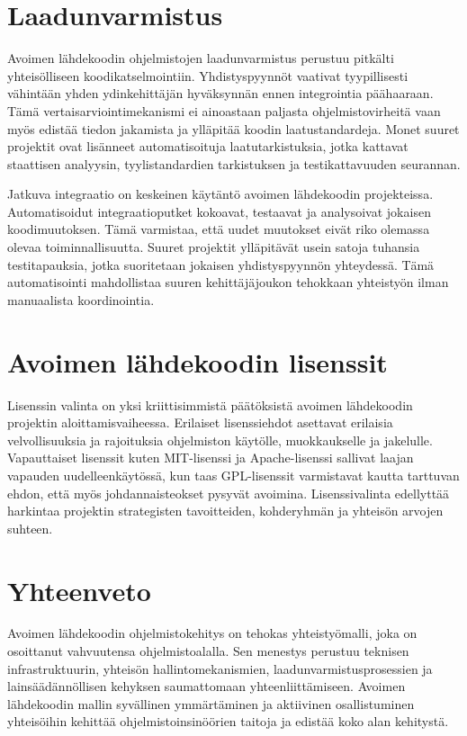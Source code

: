 \documentclass[
    language=finnish,
    doctype=article,
]{../../omnilatex}
\begin{document}
\section{Laadunvarmistus}
Avoimen lähdekoodin ohjelmistojen laadunvarmistus perustuu pitkälti yhteisölliseen koodikatselmointiin. Yhdistyspyynnöt vaativat tyypillisesti vähintään yhden ydinkehittäjän hyväksynnän ennen integrointia päähaaraan. Tämä vertaisarviointimekanismi ei ainoastaan paljasta ohjelmistovirheitä vaan myös edistää tiedon jakamista ja ylläpitää koodin laatustandardeja. Monet suuret projektit ovat lisänneet automatisoituja laatutarkistuksia, jotka kattavat staattisen analyysin, tyylistandardien tarkistuksen ja testikattavuuden seurannan.

Jatkuva integraatio on keskeinen käytäntö avoimen lähdekoodin projekteissa. Automatisoidut integraatioputket kokoavat, testaavat ja analysoivat jokaisen koodimuutoksen. Tämä varmistaa, että uudet muutokset eivät riko olemassa olevaa toiminnallisuutta. Suuret projektit ylläpitävät usein satoja tuhansia testitapauksia, jotka suoritetaan jokaisen yhdistyspyynnön yhteydessä. Tämä automatisointi mahdollistaa suuren kehittäjäjoukon tehokkaan yhteistyön ilman manuaalista koordinointia.

\section{Avoimen lähdekoodin lisenssit}
Lisenssin valinta on yksi kriittisimmistä päätöksistä avoimen lähdekoodin projektin aloittamisvaiheessa. Erilaiset lisenssiehdot asettavat erilaisia velvollisuuksia ja rajoituksia ohjelmiston käytölle, muokkaukselle ja jakelulle. Vapauttaiset lisenssit kuten MIT-lisenssi ja Apache-lisenssi sallivat laajan vapauden uudelleenkäytössä, kun taas GPL-lisenssit varmistavat kautta tarttuvan ehdon, että myös johdannaisteokset pysyvät avoimina. Lisenssivalinta edellyttää harkintaa projektin strategisten tavoitteiden, kohderyhmän ja yhteisön arvojen suhteen.

\section{Yhteenveto}
Avoimen lähdekoodin ohjelmistokehitys on tehokas yhteistyömalli, joka on osoittanut vahvuutensa ohjelmistoalalla. Sen menestys perustuu teknisen infrastruktuurin, yhteisön hallintomekanismien, laadunvarmistusprosessien ja lainsäädännöllisen kehyksen saumattomaan yhteenliittämiseen. Avoimen lähdekoodin mallin syvällinen ymmärtäminen ja aktiivinen osallistuminen yhteisöihin kehittää ohjelmistoinsinöörien taitoja ja edistää koko alan kehitystä.
\end{document}
